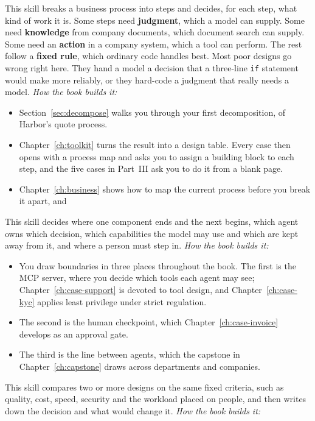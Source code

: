 \begin{description}[leftmargin=1em,itemsep=3pt]
  \item[Decomposition.] This skill breaks a business process into steps and decides, for each step, what kind of work it is. Some steps need \textbf{judgment}, which a model can supply. Some need \textbf{knowledge} from company documents, which document search can supply. Some need an \textbf{action} in a company system, which a tool can perform. The rest follow a \textbf{fixed rule}, which ordinary code handles best. Most poor designs go wrong right here. They hand a model a decision that a three-line \texttt{if} statement would make more reliably, or they hard-code a judgment that really needs a model. \emph{How the book builds it:} 
\begin{itemize}
\item   Section~\ref{sec:decompose} walks you through your first decomposition, of Harbor's quote process. 
\item Chapter~\ref{ch:toolkit} turns the result into a design table. Every case then opens with a process map and asks you to assign a building block to each step, and the five cases in Part~III ask you to do it from a blank page.
\item Chapter~\ref{ch:business} shows how to map the current process before you break it apart, and 
\end{itemize}
  \item[Boundaries.] This skill decides where one component ends and the next begins, which agent owns which decision, which capabilities the model may use and which are kept away from it, and where a person must step in. \emph{How the book builds it:} 
\begin{itemize}
\item You draw boundaries in three places throughout the book. The first is the MCP server, where you decide which tools each agent may see; Chapter~\ref{ch:case-support} is devoted to tool design, and Chapter~\ref{ch:case-kyc} applies least privilege under strict regulation. 
\item The second is the human checkpoint, which Chapter~\ref{ch:case-invoice} develops as an approval gate. 
\item The third is the line between agents, which the capstone in Chapter~\ref{ch:capstone} draws across departments and companies.
\end{itemize}
  \item[Trade-offs.] This skill compares two or more designs on the same fixed criteria, such as quality, cost, speed, security and the workload placed on people, and then writes down the decision and what would change it. \emph{How the book builds it:} 

\end{description}
